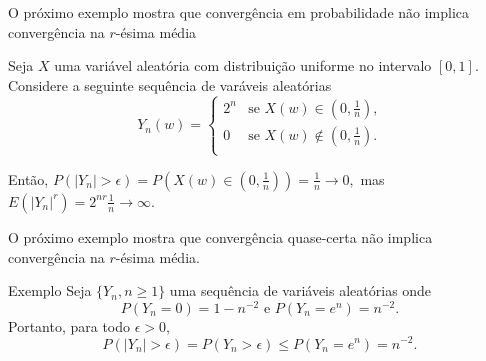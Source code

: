 \begin{frame}
%
%
O próximo exemplo mostra que convergência em probabilidade não
implica convergência na $r$-ésima média
%
\begin{exem}
Seja $X$ uma variável aleatória com distribuição uniforme no
intervalo $[0,1]$. Considere a seguinte sequência de varáveis
aleatórias
%
\[
Y_n(w)= \left\{
\begin{array}{ll}
2^n & \mbox{se $X(w)\in (0,\frac{1}{n})$,} \\
0 & \mbox{se $X(w)\notin (0,\frac{1}{n})$.} \\
\end{array}
\right.
\]

Então,
$P(|Y_n|>\epsilon)=P(X(w)\in(0,\frac{1}{n}))=\frac{1}{n}\rightarrow
0,$ mas $E(|Y_n|^r)=2^{nr}\frac{1}{n}\rightarrow\infty$.
\end{exem}
%
%
%
%
%
%
%
%
O próximo exemplo mostra que convergência quase-certa não implica convergência na $r$-ésima média.

\begin{block}{Exemplo}
Seja $\{Y_n,n\geq 1\}$ uma sequência de variáveis aleatórias onde
$$P(Y_n=0)=1-n^{-2}\mbox{ e }P(Y_n=e^n)=n^{-2}.$$
Portanto, para todo $\epsilon>0$,
$$P(|Y_n|>\epsilon)= P(Y_n>\epsilon)\leq P(Y_n=e^n)=n^{-2}.$$

\end{block}
\end{frame}

